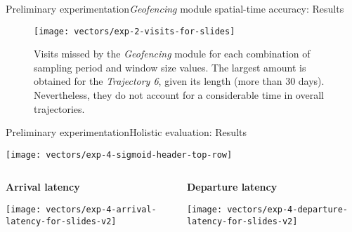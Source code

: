 \begin{frame}[noframenumbering]{Preliminary experimentation}{\emph{Geofencing} module spatial-time accuracy: Results}
\vspace{-0.5cm}
\begin{figure}
  \centering
  \texttt{[image: vectors/exp-2-visits-for-slides]}
  \caption{Visits missed by the \emph{Geofencing} module for each combination of sampling period and window size values. The largest amount is obtained for the \emph{Trajectory 6}, given its length (more than 30 days). Nevertheless, they do not account for a considerable time in overall trajectories.}
\end{figure}
\end{frame}


\begin{frame}[noframenumbering]{Preliminary experimentation}{Holistic evaluation: Results}
\small 
\vspace{-0.5cm}
{
  \centering
  \texttt{[image: vectors/exp-4-sigmoid-header-top-row]}
  \par 
}

\begin{columns}
\begin{column}[T]{0.48\textwidth}
\begin{block}{\small \textbf{Arrival latency}}
{
  \centering
  \texttt{[image: vectors/exp-4-arrival-latency-for-slides-v2]}
  \par 
}
\end{block}
\end{column}

\begin{column}[T]{0.52\textwidth}
\begin{block}{\small \textbf{Departure latency}}
{
  \centering
  \texttt{[image: vectors/exp-4-departure-latency-for-slides-v2]}
  \par
}
\end{block}
\end{column}
\end{columns}
\end{frame}


